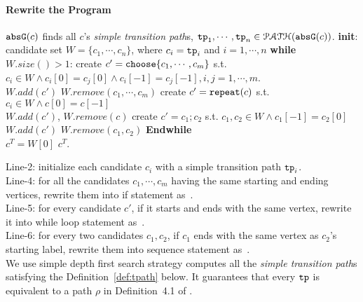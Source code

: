 \paragraph{Rewrite the Program}
\begin{algorithmic}[1]
    \REQUIRE $\mathtt{abs}{\mathtt{G}}(c)$
    \STATE finds all $c$'s \emph{simple transition path}s, $\mathtt{tp}_1, \cdots, \mathtt{tp}_n \in \mathcal{PATH}(\mathtt{abs}{\mathtt{G}}(c))$.
    \STATE \textbf{init}: candidate set $W = \{c_1, \cdots, c_n\}$, where $c_i = \mathtt{tp}_i$ and $i = 1, \cdots, n$
    \STATE \textbf{while} $W.size()> 1$:
    \STATE \quad create $c' = \rpchoose{c_1, \cdots, c_m}$ 
    s.t. $c_i \in W \land c_i[0] = c_j[0] \land c_i[-1] = c_j[-1], i, j = 1, \cdots, m$.
    \\ \quad $W.add(c')$ \qquad $W.remove(c_1, \cdots, c_m)$
    \STATE
    \quad create $c' = \mathtt{repeat}(c)$ s.t. $c_i \in W \land c[0] = c[-1]$
    \\ \quad $W.add(c')$, \qquad $W.remove(c)$
    \STATE \quad create $c' = c_1; c_2$ s.t. $c_1, c_2 \in W \land c_1[-1] = c_2[0]$
    \\
    \quad $W.add(c')$ \qquad $W.remove(c_1, c_2)$
    \STATE \textbf{Endwhile}
    \\ $c^T = W[0]$
    \RETURN $c^T$.
\end{algorithmic}
%
Line-2: initialize each candidate $c_i$ with a simple transition path $\mathtt{tp}_i$.
\\
Line-4: for all the candidates $c_1, \cdots, c_m$ having the same starting and ending vertices, rewrite them into if statement as~\cite{GulwaniJK09}.
\\
Line-5: for every candidate $c'$, if it starts and ends with the same vertex, rewrite it into while loop statement as~\cite{GulwaniJK09}.
\\
Line-6: for every two candidates $c_1, c_2$, if $c_1$ ends with the same vertex as $c_2$'s starting label, rewrite them into sequence statement as~\cite{GulwaniJK09}.
\\
We use simple depth first search strategy computes all the \emph{simple transition path}s satisfying the Definition~\ref{def:tpath} below.
It guarantees that  every $\mathtt{tp}$ is equivalent to a path $\rho$ in Definition~4.1 of \cite{GulwaniJK09}.
